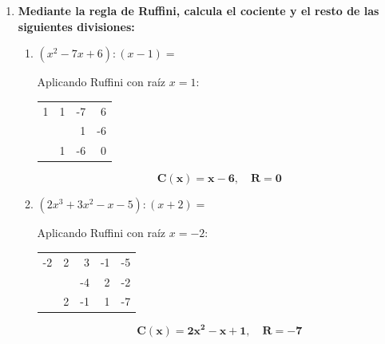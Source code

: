 \documentclass[11pt,a4paper]{article}
\begin{document}
\begin{enumerate}[label=\textbf{\arabic*.}, leftmargin=*]
\begin{enumerate}[label=\alph*), itemsep=1em]
             Realizando la división polinómica:
            $$\mathbf{C(x) = -3x^2 - 5x + 10}, \quad \mathbf{R(x) = 10x - 21}$$

            \item $(2x^5 - 4x^3 + 6x^2 - 7x + 2) : (x^2 - 3x + 1)$
            
            $$\mathbf{C(x) = 2x^3 + 6x^2 + 8x + 16}, \quad \mathbf{R(x) = 17x - 14}$$

            \item $(4x^4 - 6x^3 + 2x - 5) : (2x^2 + 1)$
            
            $$\mathbf{C(x) = 2x^2 - 3x - 1}, \quad \mathbf{R(x) = 5x - 4}$$
        \end{enumerate}

    \item \textbf{Mediante la regla de Ruffini, calcula el cociente y el resto de las siguientes divisiones:}
        \begin{enumerate}[label=\textit{\alph*})]
            \item $(x^2 - 7x + 6) : (x - 1) =$
            
             Aplicando Ruffini con raíz $x = 1$:
            \begin{center}
            \begin{tabular}{r|rrr}
              1 & 1 & -7 & 6 \\
              & & 1 & -6 \\
              \hline
              & 1 & -6 & \multicolumn{1}{|r}{0}
            \end{tabular}
            \end{center}
            $$\mathbf{C(x) = x - 6}, \quad \mathbf{R = 0}$$

            \item $(2x^3 + 3x^2 - x - 5) : (x + 2) =$
            
             Aplicando Ruffini con raíz $x = -2$:
            \begin{center}
            \begin{tabular}{r|rrrr}
              -2 & 2 & 3 & -1 & -5 \\
              & & -4 & 2 & -2 \\
              \hline
              & 2 & -1 & 1 & \multicolumn{1}{|r}{-7}
            \end{tabular}
            \end{center}
            $$\mathbf{C(x) = 2x^2 - x + 1}, \quad \mathbf{R = -7}$$


\end{enumerate}
\end{enumerate}
\end{document}
